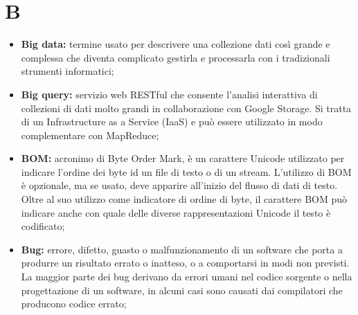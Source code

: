 \section*{\Huge B} %
\label{sec:b}
	\begin{itemize}
		\item \textbf{Big data:} termine usato per descrivere una collezione dati così grande e complessa che diventa complicato gestirla e processarla con i tradizionali strumenti informatici;
		\item \textbf{Big query:} servizio web RESTful che consente l'analisi interattiva di collezioni di dati molto grandi in collaborazione con Google Storage. Si tratta di un Infrastructure as a Service (IaaS) e può essere utilizzato in modo complementare con MapReduce;
		\item \textbf{BOM:} acronimo di Byte Order Mark, è un carattere Unicode utilizzato per indicare l'ordine dei byte id un file di testo o di un stream. L'utilizzo di BOM è opzionale, ma se usato, deve apparire all'inizio del flusso di dati di testo. Oltre al suo utilizzo come indicatore di ordine di byte, il carattere BOM può indicare anche con quale delle diverse rappresentazioni Unicode il testo è codificato;
		\item \textbf{Bug:} errore, difetto, guasto o malfunzionamento di un software che porta a produrre un risultato errato o inatteso, o a comportarsi in modi non previsti. La maggior parte dei bug derivano da errori umani nel codice sorgente o nella progettazione di un software, in alcuni casi sono causati dai compilatori che producono codice errato;
	\end{itemize}
\pagebreak

